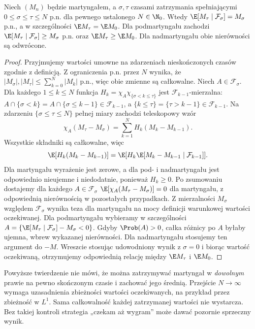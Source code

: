 \begin{twierdzenie}
Niech $(M_n)$ będzie martyngałem, a $\sigma,\tau$
czasami zatrzymania spełniającymi
$0\leq\sigma\leq\tau\leq N$ p.n. dla pewnego
ustalonego $N\in\N_0$. Wtedy
$\E[M_\tau\mid\mathcal F_\sigma]=M_\sigma$ p.n.,
a w szczególności $\E M_\tau=\E M_0$.
Dla podmartyngału zachodzi
$\E[M_\tau\mid\mathcal F_\sigma]\geq M_\sigma$
p.n. oraz $\E M_\tau\geq\E M_0$.
Dla nadmartyngału obie nierówności są odwrócone.
\end{twierdzenie}
\begin{proof}
Przyjmujemy wartości umowne na zdarzeniach
nieskończonych czasów zgodnie z definicją.
Z ograniczenia p.n. przez $N$ wynika, że
$|M_\sigma|,|M_\tau|\leq\sum_{k=0}^N|M_k|$
p.n., więc obie zmienne są całkowalne.
Niech $A\in\mathcal F_\sigma$.
Dla każdego $1\leq k\leq N$ funkcja
$H_k=\chi_{A}\chi_{\{\sigma<k\leq\tau\}}$
jest $\mathcal F_{k-1}$-mierzalna:
$A\cap\{\sigma<k\}=A\cap\{\sigma\leq k-1\}
\in\mathcal F_{k-1}$,
a $\{k\leq\tau\}=\{\tau>k-1\}\in\mathcal F_{k-1}$.
Na zdarzeniu $\{\sigma\leq\tau\leq N\}$
pełnej miary zachodzi teleskopowy wzór
\[
\chi_{A}(M_\tau-M_\sigma)
=\sum_{k=1}^N H_k(M_k-M_{k-1}).
\]
Wszystkie składniki są całkowalne, więc
\[
\E[H_k(M_k-M_{k-1})]
=\E[H_k\E[M_k-M_{k-1}\mid\mathcal F_{k-1}]].
\]
Dla martyngału wyrażenie jest zerowe,
a dla pod- i nadmartyngału jest odpowiednio
nieujemne i niedodatnie, ponieważ $H_k\geq0$.
Po zsumowaniu dostajemy dla każdego
$A\in\mathcal F_\sigma$
$\E[\chi_A(M_\tau-M_\sigma)]=0$
dla martyngału, z odpowiednią nierównością
w pozostałych przypadkach. Z mierzalności
$M_\sigma$ względem $\mathcal F_\sigma$
wynika teza dla martyngału na mocy definicji
warunkowej wartości oczekiwanej.
Dla podmartyngału wybieramy w szczególności
$A=\{\E[M_\tau\mid\mathcal F_\sigma]-M_\sigma<0\}$.
Gdyby $\Prob(A)>0$, całka różnicy po $A$
byłaby ujemna, wbrew wykazanej nierówności.
Dla nadmartyngału stosujemy ten argument do $-M$.
Wreszcie stosując udowodniony wynik z $\sigma=0$
i biorąc wartość oczekiwaną, otrzymujemy
odpowiednią relację między $\E M_\tau$ i $\E M_0$.
\end{proof}

\begin{uwaga}
Powyższe twierdzenie nie mówi, że można zatrzymywać
martyngał w \emph{dowolnym} prawie na pewno
skończonym czasie i zachować jego średnią.
Przejście $N\to\infty$ wymaga uzasadnienia
zbieżności wartości oczekiwanych, na przykład
przez zbieżność w $L^1$. Sama całkowalność
każdej zatrzymanej wartości nie wystarcza.
Bez takiej kontroli strategia „czekam aż wygram”
może dawać pozornie sprzeczny wynik.
\end{uwaga}

